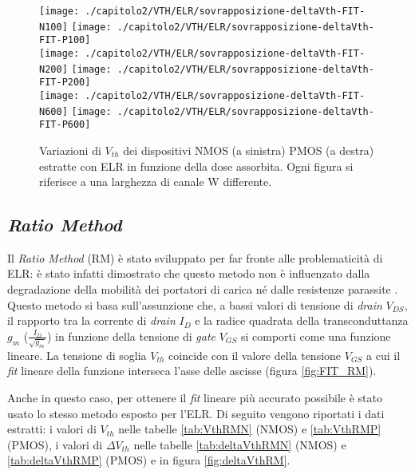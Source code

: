 \clearpage

\begin{figure}[ht]
  \centering
  \texttt{[image: ./capitolo2/VTH/ELR/sovrapposizione-deltaVth-FIT-N100]}
  \texttt{[image: ./capitolo2/VTH/ELR/sovrapposizione-deltaVth-FIT-P100]}\\
  \vspace{0.2cm}
  \texttt{[image: ./capitolo2/VTH/ELR/sovrapposizione-deltaVth-FIT-N200]}
  \texttt{[image: ./capitolo2/VTH/ELR/sovrapposizione-deltaVth-FIT-P200]}\\
  \vspace{0.2cm}
  \texttt{[image: ./capitolo2/VTH/ELR/sovrapposizione-deltaVth-FIT-N600]}
  \texttt{[image: ./capitolo2/VTH/ELR/sovrapposizione-deltaVth-FIT-P600]}
  \caption[Dati $\Delta V_{th}$ estratti con ELR]{Variazioni di $V_{th}$ dei dispositivi NMOS (a sinistra) PMOS (a destra) estratte con ELR in funzione della dose assorbita. Ogni figura si riferisce a una larghezza di canale W differente.}
  \label{fig:deltaVthELR}
\end{figure}

\FloatBarrier

\subsection[RM]{\emph{Ratio Method}}
Il \emph{Ratio Method} (RM) è stato sviluppato per far fronte alle problematicità di ELR: è stato infatti dimostrato che questo metodo non è influenzato dalla degradazione della mobilità dei portatori di carica né dalle resistenze parassite \cite{art2}. Questo metodo si basa sull'assunzione che, a bassi valori di tensione di \emph{drain} $V_{DS}$, il rapporto tra la corrente di \emph{drain} $I_D$ e la radice quadrata della transconduttanza $g_m$ ($\frac{I_D}{\sqrt{g_m}}$) in funzione della tensione di \emph{gate} $V_{GS}$ si comporti come una funzione lineare. La tensione di soglia $V_{th}$ coincide con il valore della tensione $V_{GS}$ a cui il \emph{fit} lineare della funzione interseca l'asse delle ascisse (figura \ref{fig:FIT_RM}).

Anche in questo caso, per ottenere il \emph{fit} lineare più accurato possibile è stato usato lo stesso metodo esposto per l'ELR.
Di seguito vengono riportati i dati estratti: i valori di ${V_{th}}$ nelle tabelle \ref{tab:VthRMN} (NMOS) e \ref{tab:VthRMP} (PMOS), i valori di $\Delta V_{th}$ nelle tabelle \ref{tab:deltaVthRMN} (NMOS) e \ref{tab:deltaVthRMP} (PMOS) e in figura \ref{fig:deltaVthRM}.  

